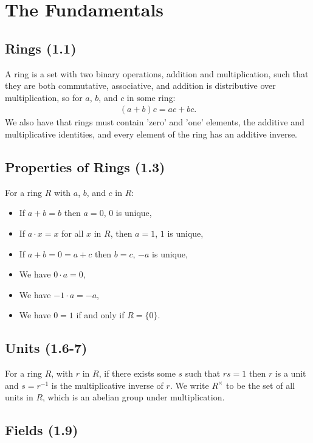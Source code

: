 \section{The Fundamentals}

\subsection{Rings (1.1)} \label{1.1}

A ring is a set with two binary operations, addition and multiplication,
such that they are both commutative, associative, and addition is distributive over
multiplication, so for $a$, $b$, and $c$ in some ring: \begin{align*}
    (a + b)c = ac + bc.
\end{align*} We also have that rings must contain 'zero' and 'one' elements, the additive and
multiplicative identities, and every element of the ring has an additive inverse.

\subsection{Properties of Rings (1.3)} \label{1.3}

For a ring $R$ with $a$, $b$, and $c$ in $R$: \begin{itemize}
    \item If $a + b = b$ then $a = 0$, $0$ is unique,
    \item If $a \cdot x = x$ for all $x$ in $R$, then $a = 1$, $1$ is unique,
    \item If $a + b = 0 = a + c$ then $b = c$, $-a$ is unique, 
    \item We have $0 \cdot a = 0$,
    \item We have $-1 \cdot a = -a$,
    \item We have $0 = 1$ if and only if $R = \{0\}$.
\end{itemize}

\subsection{Units (1.6-7)} \label{1.6} \label{1.7}

For a ring $R$, with $r$ in $R$, if there exists some $s$ such that $rs = 1$ then $r$
is a unit and $s = r^{-1}$ is the multiplicative inverse of $r$. We write $R^\times$ to
be the set of all units in $R$, which is an abelian group under multiplication.

\subsection{Fields (1.9)} \label{1.9}

